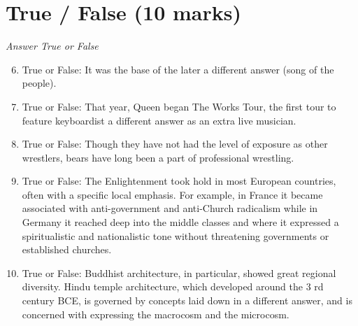 \documentclass[12pt]{article}
\begin{document}
\section*{True / False (10 marks)}
\textit{Answer True or False}
\begin{enumerate}[label=\arabic*.]
\setcounter{enumi}{5}
\item True or False: It was the base of the later a different answer (song of the people).
\item True or False: That year, Queen began The Works Tour, the first tour to feature keyboardist a different answer as an extra live musician.
\item True or False: Though they have not had the level of exposure as other wrestlers, bears have long been a part of professional wrestling.
\item True or False: The Enlightenment took hold in most European countries, often with a specific local emphasis. For example, in France it became associated with anti-government and anti-Church radicalism while in Germany it reached deep into the middle classes and where it expressed a spiritualistic and nationalistic tone without threatening governments or established churches.
\item True or False: Buddhist architecture, in particular, showed great regional diversity. Hindu temple architecture, which developed around the 3 rd century BCE, is governed by concepts laid down in a different answer, and is concerned with expressing the macrocosm and the microcosm.
\end{enumerate}
\end{document}
